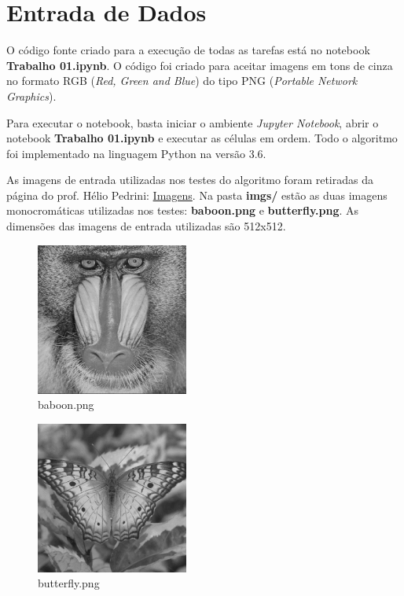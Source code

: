 \documentclass[twoside,twocolumn]{article}
\begin{document}

\section{Entrada de Dados}

O código fonte criado para a execução de todas as tarefas está no notebook \textbf{Trabalho 01.ipynb}. O código foi criado para aceitar imagens em tons de cinza no formato RGB (\textit{Red, Green and Blue}) do tipo PNG (\textit{Portable Network Graphics}).

Para executar o notebook, basta iniciar o ambiente \textit{Jupyter Notebook}, abrir o notebook \textbf{Trabalho 01.ipynb} e executar as células em ordem. Todo o algoritmo foi implementado na linguagem Python na versão 3.6.

As imagens de entrada utilizadas nos testes do algoritmo foram retiradas da página do prof. Hélio Pedrini: \href{http://www.ic.unicamp.br/~helio/imagens_png/}{Imagens}. Na pasta \textbf{imgs/} estão as duas imagens monocromáticas utilizadas nos testes: \textbf{baboon.png} e \textbf{butterfly.png}. As dimensões das imagens de entrada utilizadas são 512x512.

\begin{figure}[tb]
\begin{center}
	\includegraphics[height=5cm]{figures/baboon.png}
\caption{baboon.png} \label{gdimotes}
\end{center}
\end{figure}

\begin{figure}[tb]
\begin{center}
	\includegraphics[height=5cm]{figures/butterfly.png}
\caption{butterfly.png} \label{gdimotes}
\end{center}
\end{figure}
\end{document}
